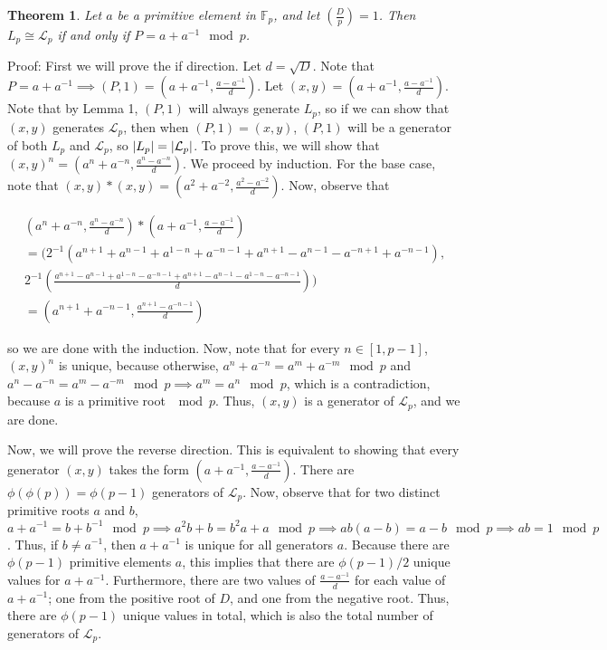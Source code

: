\documentclass{article}
\DeclarePairedDelimiter{\abs}{\lvert}{\rvert}
\newcommand{\legendre}[2]{\genfrac{(}{)}{}{}{#1}{#2}}
\newtheorem{theorem}{Theorem}
\begin{document}
\begin{theorem}
Let $a$ be a primitive element in $\mathbb{F}_p$, and let $\legendre{D}{p} = 1$. Then $L_p \cong \mathcal{L}_p$ if and only if $P = a + a^{-1} \mod p$.
\end{theorem}

Proof: First we will prove the if direction. Let $d = \sqrt{D}$. Note that $P = a + a^{-1} \implies (P,1) = (a+ a^{-1}, \frac{a-a^{-1}}{d})$. Let $(x,y) = (a+a^{-1}, \frac{a-a^{-1}}{d})$. Note that by Lemma 1, $(P,1)$ will always generate $L_p$, so if we can show that $(x,y)$ generates $\mathcal{L}_p$, then when $(P,1) = (x,y)$, $(P,1)$ will be a generator of both $L_p$ and $\mathcal{L}_p$, so $\abs{L_p} = \abs{\mathcal{L}_p}$. To prove this, we will show that $(x,y)^n = (a^n + a^{-n}, \frac{a^n - a^{-n}}{d})$. We proceed by induction. For the base case, note that $(x,y)*(x,y) = (a^2 + a^{-2}, \frac{a^2-a^{-2}}{d})$. Now, observe that 

\begin{gather*}
(a^{n}+a^{-n}, \frac{a^{n}-a^{-n}}{d})*(a+a^{-1}, \frac{a-a^{-1}}{d}) \\
= (2^{-1}(a^{n+1} + a^{n-1} + a^{1-n} + a^{-n-1} + a^{n+1} - a^{n-1} - a^{-n+1} + a^{-n-1}), \\
2^{-1}(\frac{a^{n+1} - a^{n-1} + a^{1-n} - a^{-n-1} + a^{n+1} - a^{n-1} - a^{1-n} - a^{-n-1}}{d})) \\
= (a^{n+1} + a^{-n-1}, \frac{a^{n+1} - a^{-n-1}}{d})
\end{gather*}

so we are done with the induction. Now, note that for every $n \in [1, p-1]$, $(x,y)^n$ is unique, because otherwise, $a^n + a^{-n} = a^m + a^{-m} \mod p$ and $a^n - a^{-n} = a^m - a^{-m} \mod p \implies a^m = a^n \mod p$, which is a contradiction, because $a$ is a primitive root $\mod p$. Thus, $(x,y)$ is a generator of $\mathcal{L}_p$, and we are done. 

Now, we will prove the reverse direction. This is equivalent to showing that every generator $(x,y)$ takes the form $(a+a^{-1}, \frac{a-a^{-1}}{d})$. There are $\phi(\phi(p)) = \phi(p-1)$ generators of $\mathcal{L}_p$. Now, observe that for two distinct primitive roots $a$ and $b$, $a + a^{-1} = b + b^{-1} \mod p \implies a^2b + b = b^2a + a \mod p \implies ab(a-b) = a-b \mod p \implies ab = 1 \mod p$. Thus, if $b \neq a^{-1}$, then $a + a^{-1}$ is unique for all generators $a$. Because there are $\phi(p-1)$ primitive elements $a$, this implies that there are $\phi(p-1)/2$ unique values for $a + a^{-1}$. Furthermore, there are two values of $\frac{a-a^{-1}}{d}$ for each value of $a + a^{-1}$; one from the positive root of $D$, and one from the negative root. Thus, there are $\phi(p-1)$ unique values in total, which is also the total number of generators of $\mathcal{L}_p$. 
\end{document}
